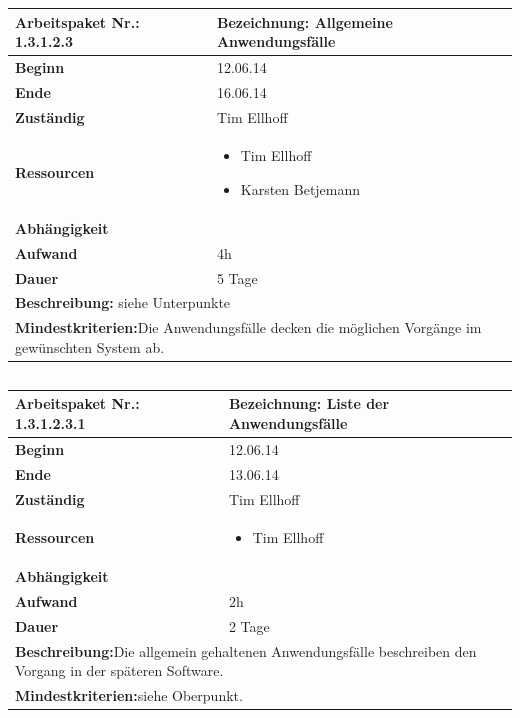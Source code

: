 \documentclass[fontsize=12pt,paper=a4,twoside]{scrartcl}
\begin{document}
\begin{verbatim} 
\end{verbatim}

\begin{tabular}{|p{5.3cm}|p{9.7cm}|}\hline
	\textbf{Arbeitspaket Nr.:} 1.3.1.2.3 & \textbf{Bezeichnung:} Allgemeine Anwendungsfälle\\ \hline \hline
	\textbf{Beginn} & 12.06.14\\ \hline
	\textbf{Ende} & 16.06.14\\ \hline
	\textbf{Zuständig} & Tim Ellhoff\\ \hline
	\textbf{Ressourcen} & \begin{itemize}
		\item Tim Ellhoff
		\item Karsten Betjemann
	\end{itemize}    \\ \hline
	\textbf{Abhängigkeit} &\\ \hline
	\textbf{Aufwand} & 4h \\ \hline
	\textbf{Dauer} & 5 Tage\\ \hline
	\multicolumn{2}{|p{15cm}|}{\textbf{Beschreibung:} siehe Unterpunkte\newline  }\\ \hline
	\multicolumn{2}{|p{15cm}|}{\textbf{Mindestkriterien:}\newline Die Anwendungsfälle decken die möglichen Vorgänge im gewünschten System ab. }\\ \hline
\end{tabular}

\begin{verbatim} 
\end{verbatim}

\begin{tabular}{|p{5.3cm}|p{9.7cm}|}\hline
	\textbf{Arbeitspaket Nr.:} 1.3.1.2.3.1 & \textbf{Bezeichnung:} Liste der Anwendungsfälle\\ \hline \hline
	\textbf{Beginn} & 12.06.14\\ \hline
	\textbf{Ende} & 13.06.14\\ \hline
	\textbf{Zuständig} & Tim Ellhoff\\ \hline
	\textbf{Ressourcen} & \begin{itemize}
		\item Tim Ellhoff 
	\end{itemize}    \\ \hline
	\textbf{Abhängigkeit} &\\ \hline
	\textbf{Aufwand} & 2h\\ \hline
	\textbf{Dauer} & 2 Tage\\ \hline
	\multicolumn{2}{|p{15cm}|}{\textbf{Beschreibung:}\newline Die allgemein gehaltenen Anwendungsfälle beschreiben den Vorgang in der späteren Software.}\\ \hline
	\multicolumn{2}{|p{15cm}|}{\textbf{Mindestkriterien:}\newline siehe Oberpunkt. }\\ \hline
\end{tabular}
\end{document}

